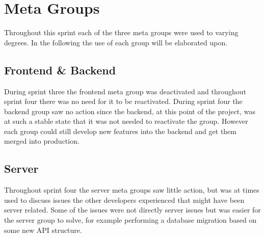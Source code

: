 \section{Meta Groups}
Throughout this sprint each of the three meta groups were used to varying degrees. 
In the following the use of each group will be elaborated upon. 
 
\subsection{Frontend \& Backend}
During sprint three the frontend meta group was deactivated and throughout sprint four there was no need for it to be reactivated. 
During sprint four the backend group saw no action since the backend, at this point of the project, was at such a stable state that it was not needed to reactivate the group.
However each group could still develop new features into the backend and get them merged into production. 

\subsection{Server}
Throughout sprint four the server meta groups saw little action, but was at times used to discuss issues the other developers experienced that might have been server related. 
Some of the issues were not directly server issues but was easier for the server group to solve, for example performing a database migration based on some new API structure.



